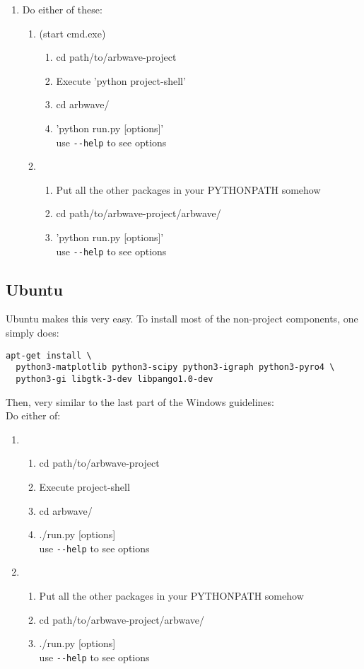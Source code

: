 \begin{enumerate}
  \item Do either of these:
    \begin{enumerate}
      \item  (start cmd.exe)
        \begin{enumerate}
          \item cd path/to/arbwave-project
          \item Execute 'python project-shell'
          \item cd arbwave/
          \item 'python run.py [options]'\\
            use \verb|--help| to see options
        \end{enumerate}
      \item
        \begin{enumerate}
          \item Put all the other packages in your PYTHONPATH somehow
          \item cd path/to/arbwave-project/arbwave/
          \item 'python run.py [options]'\\
            use \verb|--help| to see options
        \end{enumerate}
    \end{enumerate}
\end{enumerate}



\subsection{Ubuntu}
Ubuntu makes this very easy.  To install most of the non-project components, one
simply does:

\begin{verbatim}
apt-get install \
  python3-matplotlib python3-scipy python3-igraph python3-pyro4 \
  python3-gi libgtk-3-dev libpango1.0-dev
\end{verbatim}


Then, very similar to the last part of the Windows guidelines: \\
Do either of:
\begin{enumerate}
  \item
    \begin{enumerate}
      \item cd path/to/arbwave-project
      \item Execute project-shell
      \item cd arbwave/
      \item ./run.py [options]\\
        use \verb|--help| to see options
    \end{enumerate}
  \item
    \begin{enumerate}
      \item Put all the other packages in your PYTHONPATH somehow
      \item cd path/to/arbwave-project/arbwave/
      \item ./run.py [options]\\
        use \verb|--help| to see options
    \end{enumerate}
\end{enumerate}
